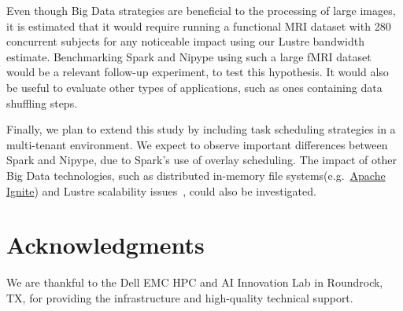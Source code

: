 \documentclass{IEEEtran}
\begin{document}
Even though Big Data strategies are beneficial to the processing of 
large images, it is estimated that it would require running a 
functional MRI dataset with 280 concurrent subjects for any noticeable 
impact using our Lustre bandwidth estimate. Benchmarking Spark and 
Nipype using such a large fMRI dataset would be a relevant follow-up 
experiment, to test this hypothesis. It would also be useful to evaluate
other types of applications, such as ones containing data shuffling steps.

Finally, we plan to extend this study by including task scheduling 
strategies in a multi-tenant environment. We expect to observe 
important differences between Spark and Nipype, due to Spark's use of 
overlay scheduling. The impact of other Big Data technologies, such as 
distributed in-memory file systems(e.g.~\href{https://ignite.apache.org}{Apache Ignite}) and Lustre scalability issues~\cite{sparkhpc},
could also be investigated.

\section{Acknowledgments}

We are thankful to the Dell EMC HPC and AI Innovation Lab
in Roundrock, TX, for providing the infrastructure and high-quality
technical support.

 

\end{document}

